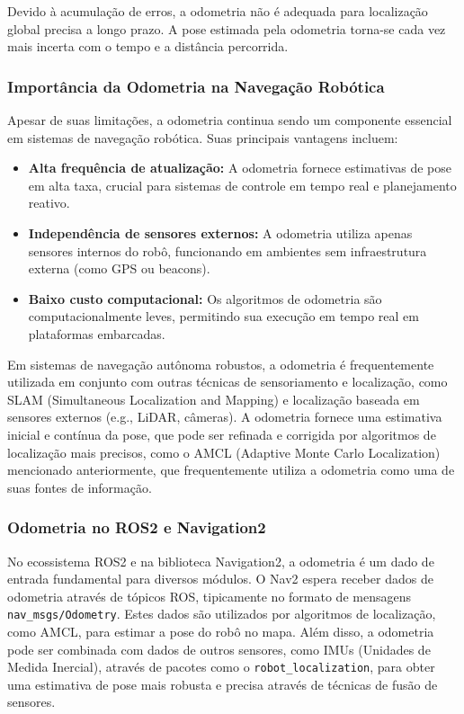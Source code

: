 Devido à acumulação de erros, a odometria não é adequada para localização
global precisa a longo prazo. A pose estimada pela odometria torna-se cada vez
mais incerta com o tempo e a distância percorrida.

\subsubsection{Importância da Odometria na Navegação Robótica}

Apesar de suas limitações, a odometria continua sendo um componente essencial
em sistemas de navegação robótica. Suas principais vantagens incluem:

\begin{itemize}
    \item \textbf{Alta frequência de atualização:} A odometria fornece estimativas de pose em alta taxa, crucial para sistemas de controle em tempo real e planejamento reativo.
    \item \textbf{Independência de sensores externos:} A odometria utiliza apenas sensores internos do robô, funcionando em ambientes sem infraestrutura externa (como GPS ou beacons).
    \item \textbf{Baixo custo computacional:} Os algoritmos de odometria são computacionalmente leves, permitindo sua execução em tempo real em plataformas embarcadas.
\end{itemize}

Em sistemas de navegação autônoma robustos, a odometria é frequentemente
utilizada em conjunto com outras técnicas de sensoriamento e localização, como
SLAM (Simultaneous Localization and Mapping) e localização baseada em sensores
externos (e.g., LiDAR, câmeras). A odometria fornece uma estimativa inicial e
contínua da pose, que pode ser refinada e corrigida por algoritmos de
localização mais precisos, como o AMCL (Adaptive Monte Carlo Localization)
mencionado anteriormente, que frequentemente utiliza a odometria como uma de
suas fontes de informação.

\subsubsection{Odometria no ROS2 e Navigation2}

No ecossistema ROS2 e na biblioteca Navigation2, a odometria é um dado de
entrada fundamental para diversos módulos. O Nav2 espera receber dados de
odometria através de tópicos ROS, tipicamente no formato de mensagens
\texttt{nav\_msgs/Odometry}. Estes dados são utilizados por algoritmos de
localização, como AMCL, para estimar a pose do robô no mapa. Além disso, a
odometria pode ser combinada com dados de outros sensores, como IMUs (Unidades
de Medida Inercial), através de pacotes como o \texttt{robot\_localization},
para obter uma estimativa de pose mais robusta e precisa através de técnicas de
fusão de sensores.

